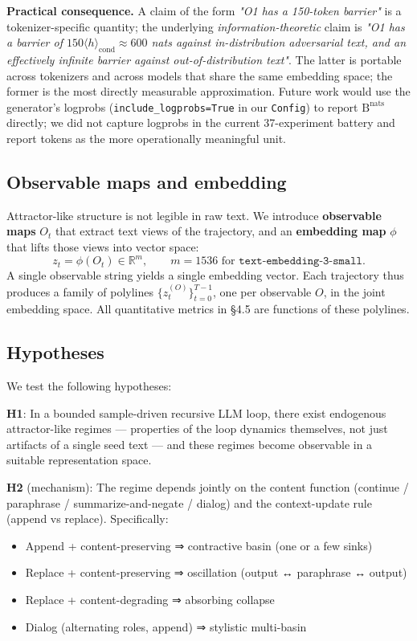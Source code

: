 \documentclass{article}
\theoremstyle{plain}
\theoremstyle{definition}
\begin{document}
\textbf{Practical consequence.} A claim of the form \textit{"O1 has a 150-token
barrier"} is a tokenizer-specific quantity; the underlying
\textit{information-theoretic} claim is \textit{"O1 has a barrier of $150
\langle h \rangle_\text{cond} \approx 600$ nats against in-distribution
adversarial text, and an effectively infinite barrier against
out-of-distribution text"}. The latter is portable across tokenizers
and across models that share the same embedding space; the former is
the most directly measurable approximation. Future work would use the
generator's logprobs (\texttt{include\_logprobs=True} in our \texttt{Config}) to
report $\mathrm{B}^{\text{nats}}$ directly; we did not capture logprobs
in the current 37-experiment battery and report tokens as the more
operationally meaningful unit.

\subsection{Observable maps and embedding}

Attractor-like structure is not legible in raw text. We introduce
\textbf{observable maps} $O_t$ that extract text views of the trajectory,
and an \textbf{embedding map} $\phi$ that lifts those views into vector space:
\begin{equation*}
z_t = \phi(O_t) \in \mathbb{R}^m,
\qquad
m = 1536 \text{ for } \texttt{text-embedding-3-small}.
\end{equation*}
A single observable string yields a single embedding vector. Each
trajectory thus produces a family of polylines $\{z_t^{(O)}\}_{t=0}^{T-1}$,
one per observable $O$, in the joint embedding space. All quantitative
metrics in §4.5 are functions of these polylines.

\subsection{Hypotheses}

We test the following hypotheses:

\textbf{H1}: In a bounded sample-driven recursive LLM loop, there exist
endogenous attractor-like regimes — properties of the loop dynamics
themselves, not just artifacts of a single seed text — and these regimes
become observable in a suitable representation space.

\textbf{H2} (mechanism): The regime depends jointly on the content function
(continue / paraphrase / summarize-and-negate / dialog) and the
context-update rule (append vs replace). Specifically:
\begin{itemize}
  \item Append + content-preserving ⇒ contractive basin (one or a few sinks)
  \item Replace + content-preserving ⇒ oscillation (output ↔ paraphrase ↔ output)
  \item Replace + content-degrading ⇒ absorbing collapse
  \item Dialog (alternating roles, append) ⇒ stylistic multi-basin
\end{itemize}
\end{document}
